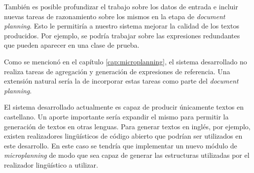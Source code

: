 También es posible profundizar el trabajo sobre los datos de entrada e incluir nuevas tareas de razonamiento sobre los mismos en la etapa de \textit{document planning}. Esto le permitiría a nuestro sistema mejorar la calidad de los textos producidos. Por ejemplo, se podría trabajar sobre las expresiones redundantes que pueden aparecer en una clase de prueba.

Como se mencionó en el capítulo \ref{cap:microplanning}, el sistema desarrollado no realiza tareas de agregación y generación de expresiones de referencia. Una extensión natural sería la de incorporar estas tareas como parte del \textit{document planning}.

El sistema desarrollado actualmente es capaz de producir únicamente textos en castellano. Un aporte importante sería expandir el mismo para permitir la generación de textos en otras lenguas. Para generar textos en inglés, por ejemplo, existen realizadores lingüísticos de código abierto que podrían ser utilizados en este desarrollo. En este caso se tendría que implementar un nuevo módulo de \textit{microplanning} de modo que sea capaz de generar las estructuras utilizadas por el realizador lingüístico a utilizar.